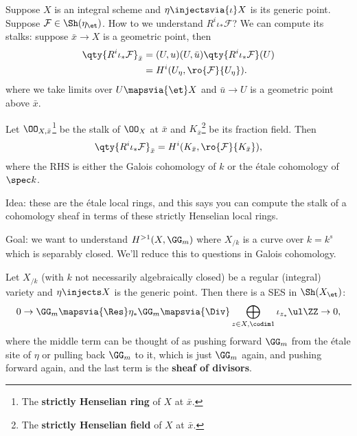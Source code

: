 \begin{example}[?]

Suppose \(X\) is an integral scheme and \(\eta\injectsvia{\iota} X\) is
its generic point. Suppose \(\mathcal{F}\in \Sh(\eta_\et)\). How to we
understand \(R^i \iota_* \mathcal{F}\)? We can compute its stalks:
suppose \(\bar x \to X\) is a geometric point, then
\begin{align*}  
\qty{R^i \iota_* \mathcal{F}}_{\bar x} 
&= 
\directlim_{(U, \bar u)} \qty{R^i \iota_* \mathcal{F}}(U) \\
&=
H^i(U_\eta, \ro{\mathcal{F}}{U_\eta})
.\end{align*} where we take limits over \(U\mapsvia{\et} X\) and
\(\bar u\to U\) is a geometric point above \(\bar x\).

\begin{exercise}

Let \(\OO_{X, \bar x}\)\footnote{The \textbf{strictly Henselian ring} of
  \(X\) at \(\bar x\).} be the stalk of \(\OO_X\) at \(\bar x\) and
\(K_{\bar x}\)\footnote{The \textbf{strictly Henselian field} of \(X\)
  at \(\bar x\).} be its fraction field. Then
\begin{align*}  
\qty{R^i \iota_* \mathcal{F}}_{\bar x}
=
H^i(K_{\bar x}, \ro{\mathcal{F}} {K_{\bar x}} )
,\end{align*} where the RHS is either the Galois cohomology of \(k\) or
the étale cohomology of \(\spec k\).

Idea: these are the étale local rings, and this says you can compute the
stalk of a cohomology sheaf in terms of these strictly Henselian local
rings.

\end{exercise}

\end{example}

Goal: we want to understand \(H^{>1}(X, \GG_m)\) where \(X_{/k}\) is a
curve over \(k = k^{s}\) which is separably closed. We'll reduce this to
questions in Galois cohomology.

\begin{proposition}[?]

Let \(X_{/k}\) (with \(k\) not necessarily algebraically closed) be a
regular (integral) variety and \(\eta\injects X\) is the generic point.
Then there is a SES in \(\Sh(X_\et)\):
\begin{align*}  
0 \to
\GG_m
\mapsvia{\Res}
\eta_* \GG_m 
\mapsvia{\Div}
\bigoplus_{z\in X, \codim 1} \iota_{z_*} \ul \ZZ
\to 0
,\end{align*} where the middle term can be thought of as pushing forward
\(\GG_m\) from the étale site of \(\eta\) or pulling back \(\GG_m\) to
it, which is just \(\GG_m\) again, and pushing forward again, and the
last term is the \textbf{sheaf of divisors}.

\end{proposition}

